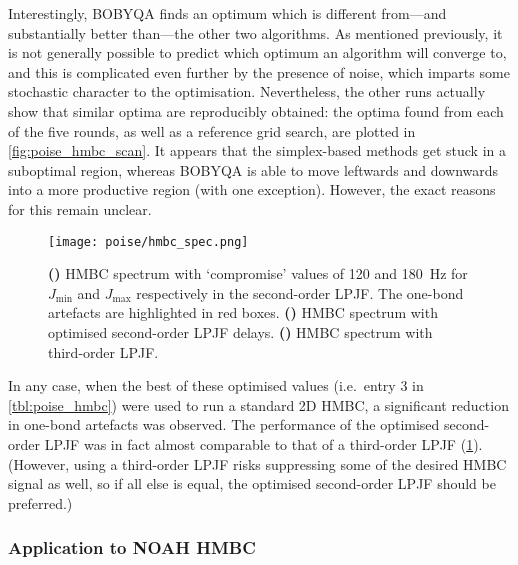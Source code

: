 Interestingly, BOBYQA finds an optimum which is different from---and substantially better than---the other two algorithms.
As mentioned previously, it is not generally possible to predict which optimum an algorithm will converge to, and this is complicated even further by the presence of noise, which imparts some stochastic character to the optimisation.
Nevertheless, the other runs actually show that similar optima are reproducibly obtained: the optima found from each of the five rounds, as well as a reference grid search, are plotted in \cref{fig:poise_hmbc_scan}.
It appears that the simplex-based methods get stuck in a suboptimal region, whereas BOBYQA is able to move leftwards and downwards into a more productive region (with one exception).
However, the exact reasons for this remain unclear.

\begin{figure}[htb]
    \centering
    \texttt{[image: poise/hmbc\_spec.png]}%
    {\label{fig:poise_hmbc_spec_unopt2}}%
    {\label{fig:poise_hmbc_spec_opt2}}%
    {\label{fig:poise_hmbc_spec_3}}%
    \caption[HMBC spectra before and after optimisation]{
        \textbf{()} HMBC spectrum with `compromise' values of 120 and \qty{180}{\Hz} for $J_\text{min}$ and $J_\text{max}$ respectively in the second-order LPJF.
        The one-bond artefacts are highlighted in red boxes.
        \textbf{()} HMBC spectrum with optimised second-order LPJF delays.
        \textbf{()} HMBC spectrum with third-order LPJF.
    }
    \label{fig:poise_hmbc_spec}
\end{figure}

In any case, when the best of these optimised values (i.e.\ entry 3 in \cref{tbl:poise_hmbc}) were used to run a standard 2D HMBC, a significant reduction in one-bond artefacts was observed.
The performance of the optimised second-order LPJF was in fact almost comparable to that of a third-order LPJF (\cref{fig:poise_hmbc_spec}).
(However, using a third-order LPJF risks suppressing some of the desired HMBC signal as well, so if all else is equal, the optimised second-order LPJF should be preferred.)


\subsubsection{Application to NOAH HMBC}

